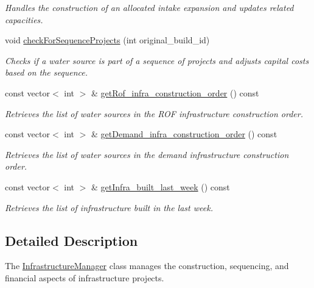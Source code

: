 \begin{DoxyCompactItemize}
\begin{DoxyCompactList}\small\item\em Handles the construction of an allocated intake expansion and updates related capacities. \end{DoxyCompactList}\item 
void \mbox{\hyperlink{classInfrastructureManager_a4eca31074654eb197ba33342eee3bd32}{check\+For\+Sequence\+Projects}} (int original\+\_\+build\+\_\+id)
\begin{DoxyCompactList}\small\item\em Checks if a water source is part of a sequence of projects and adjusts capital costs based on the sequence. \end{DoxyCompactList}\item 
const vector$<$ int $>$ \& \mbox{\hyperlink{classInfrastructureManager_a0f944c7704cc5418ba58b71c7a1e15a7}{get\+Rof\+\_\+infra\+\_\+construction\+\_\+order}} () const
\begin{DoxyCompactList}\small\item\em Retrieves the list of water sources in the R\+OF infrastructure construction order. \end{DoxyCompactList}\item 
const vector$<$ int $>$ \& \mbox{\hyperlink{classInfrastructureManager_aac2a99dbffe7f784f09de907ad384d8b}{get\+Demand\+\_\+infra\+\_\+construction\+\_\+order}} () const
\begin{DoxyCompactList}\small\item\em Retrieves the list of water sources in the demand infrastructure construction order. \end{DoxyCompactList}\item 
const vector$<$ int $>$ \& \mbox{\hyperlink{classInfrastructureManager_a540f233692981645d52af7f1de087dbf}{get\+Infra\+\_\+built\+\_\+last\+\_\+week}} () const
\begin{DoxyCompactList}\small\item\em Retrieves the list of infrastructure built in the last week. \end{DoxyCompactList}\end{DoxyCompactItemize}


\subsection{Detailed Description}
The {\ttfamily \mbox{\hyperlink{classInfrastructureManager}{Infrastructure\+Manager}}} class manages the construction, sequencing, and financial aspects of infrastructure projects. 

